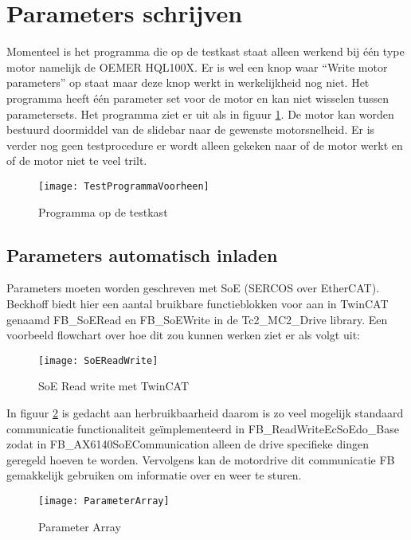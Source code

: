 \section{Parameters schrijven}

Momenteel is het programma die op de testkast staat alleen werkend bij één type motor namelijk de OEMER HQL100X. Er is wel een knop waar “Write motor parameters” op staat maar deze knop werkt in werkelijkheid nog niet. Het programma heeft één parameter set voor de motor en kan niet wisselen tussen parametersets. Het programma ziet er uit als in figuur \ref{fig:TestProgrammaVoorheen}. De motor kan worden bestuurd doormiddel van de slidebar naar de gewenste motorsnelheid. Er is verder nog geen testprocedure er wordt alleen gekeken naar of de motor werkt en of de motor niet te veel trilt.

\begin{figure}[H]
	\centering
	\texttt{[image: TestProgrammaVoorheen]}
	\label{fig:TestProgrammaVoorheen}
	\caption{Programma op de testkast}
\end{figure}

\subsection{Parameters automatisch inladen}

Parameters moeten worden geschreven met \gls{SoE} (\gls{SERCOS} over \gls{EtherCAT}). Beckhoff biedt hier een aantal bruikbare functieblokken voor aan in \gls{TwinCAT} genaamd FB\_SoERead en FB\_SoEWrite in de Tc2\_MC2\_Drive library. Een voorbeeld flowchart over hoe dit zou kunnen werken ziet er als volgt uit:

\begin{figure}[H]
	\centering
	\texttt{[image: SoEReadWrite]}
	\label{fig:SoEReadWrite}
	\caption{SoE Read write met TwinCAT}
\end{figure}

In figuur \ref{fig:SoEReadWrite} is gedacht aan herbruikbaarheid daarom is zo veel mogelijk standaard communicatie functionaliteit geïmplementeerd in FB\_ReadWriteEcSoEdo\_Base zodat in FB\_AX6140SoECommunication alleen de drive specifieke dingen geregeld hoeven te worden. Vervolgens kan de motordrive dit communicatie FB gemakkelijk gebruiken om informatie over en weer te sturen.

\begin{figure}[H]
	\centering
	\texttt{[image: ParameterArray]}
	\label{fig:ParameterArray}
	\caption{Parameter Array}
\end{figure}

